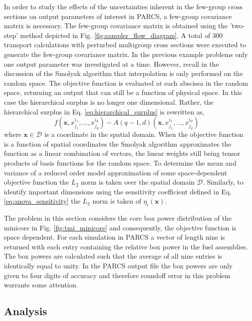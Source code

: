 In order to study the effects of the uncertainties inherent in the few-group cross sections on output parameters of interest in \ac{PARCS}, a few-group covariance matrix is necessary. The few-group covariance matrix is obtained using the 'two-step' method depicted in Fig. \ref{fig:sampler_flow_diagram}. A total of 300 transport calculations with perturbed multigroup cross sections were executed to generate the few-group covariance matrix. In the previous example problems only one output parameter was investigated at a time. However, recall in the discussion of the Smolyak algorithm that interpolation is only performed on the random space. The objective function is evaluated at each abscissa in the random space, returning an output that can still be a function of physical space. In this case the hierarchical surplus is no longer one dimensional. Rather, the hierarchical surplus in Eq. \ref{eq:hierarchical_surplus} is rewritten as,
\begin{equation} 
\label{eq:hierarchical_surplus_space}
   f(\mathbf{x}, x_{j_1}^{i_1},...,x_{j_d}^{i_d}) - 
    A(q-1,d)(\mathbf{x}, x_{j_1}^{i_1},...,x_{j_d}^{i_d})
\end{equation}
where $\mathbf{x} \in \mathcal{D}$ is a coordinate in the spatial domain. When the objective function is a function of spatial coordinates the Smolyak algorithm approximates the function as a linear combination of vectors, the linear weights still being tensor products of basis functions for the random space. To determine the mean and variance of a reduced order model approximation of some space-dependent objective function the $L_2$ norm is taken over the spatial domain $\mathcal{D}$. Similarly, to identify important dimensions using the sensitivity coefficient defined in Eq. \ref{eq:anova_sensitivity} the $L_2$ norm is taken of $\eta_i(\mathbf{x})$.  

The problem in this section considers the core box power distribution of the minicore in Fig. \ref{fig:tmi_minicore} and consequently, the objective function is space dependent. For each simulation in \ac{PARCS} a vector of length nine is returned with each entry containing the relative box power in the fuel assemblies. The box powers are calculated such that the average of all nine entries is identically equal to unity. In the \ac{PARCS} output file the box powers are only given to four digits of accuracy and therefore roundoff error in this problem warrants some attention.  

\subsection{Analysis}
\label{subsec:tmi_analysis}

